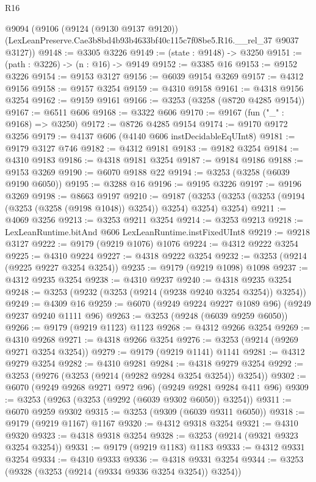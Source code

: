 \begin{lexlean}{R16}
\begin{coremodule}
  @9094
    (@9106
      (@9124 (@9130 @9137 @9120))
      (LexLeanPreserve.Cae3b8bd4b93b4633bf40c115c7f08be5.R16.__rel_37 @9037 @3127))
@9148 := @3305 @3226
@9149 := (state : @9148) -> @3250
@9151 := (path : @3226) -> (n : @16) -> @9149
@9152 := @3385 @16
@9153 := @9152 @3226
@9154 := @9153 @3127
@9156 := @6039 @9154 @3269
@9157 := @4312 @9156
@9158 := @9157 @3254
@9159 := @4310 @9158
@9161 := @4318 @9156 @3254
@9162 := @9159 @9161
@9166 := @3253 (@3258 (@8720 @4285 @9154))
@9167 := @6511 @606
@9168 := @3322 @606
@9170 := @9167 (fun ("_" : @9168) => @3250)
@9172 := @8726 @4285 @9154
@9174 := @9170 @9172 @3256
@9179 := @4137 @606 (@4140 @606 instDecidableEqUInt8)
@9181 := @9179 @3127 @746
@9182 := @4312 @9181
@9183 := @9182 @3254
@9184 := @4310 @9183
@9186 := @4318 @9181 @3254
@9187 := @9184 @9186
@9188 := @9153 @3269
@9190 := @6070 @9188 @22
@9194 := @3253 (@3258 (@6039 @9190 @6050))
@9195 := @3288 @16
@9196 := @9195 @3226
@9197 := @9196 @3269
@9198 := @8663 @9197
@9210 := @9187 (@3253 (@3253 (@3253 (@9194 (@3253 (@3258 (@9198 @1048)) @3254)) @3254) @3254) @3254)
@9211 := @4069 @3256
@9213 := @3253 @9211 @3254
@9214 := @3253 @9213
@9218 := LexLeanRuntime.bitAnd @606 LexLeanRuntime.instFixedUInt8
@9219 := @9218 @3127
@9222 := @9179 (@9219 @1076) @1076
@9224 := @4312 @9222 @3254
@9225 := @4310 @9224
@9227 := @4318 @9222 @3254
@9232 := @3253 (@9214 (@9225 @9227 @3254 @3254))
@9235 := @9179 (@9219 @1098) @1098
@9237 := @4312 @9235 @3254
@9238 := @4310 @9237
@9240 := @4318 @9235 @3254
@9248 := @3253 (@9232 (@3253 (@9214 (@9238 @9240 @3254 @3254)) @3254))
@9249 := @4309 @16
@9259 := @6070 (@9249 @9224 @9227 @1089 @96) (@9249 @9237 @9240 @1111 @96)
@9263 := @3253 (@9248 (@6039 @9259 @6050))
@9266 := @9179 (@9219 @1123) @1123
@9268 := @4312 @9266 @3254
@9269 := @4310 @9268
@9271 := @4318 @9266 @3254
@9276 := @3253 (@9214 (@9269 @9271 @3254 @3254))
@9279 := @9179 (@9219 @1141) @1141
@9281 := @4312 @9279 @3254
@9282 := @4310 @9281
@9284 := @4318 @9279 @3254
@9292 := @3253 (@9276 (@3253 (@9214 (@9282 @9284 @3254 @3254)) @3254))
@9302 := @6070 (@9249 @9268 @9271 @972 @96) (@9249 @9281 @9284 @411 @96)
@9309 := @3253 (@9263 (@3253 (@9292 (@6039 @9302 @6050)) @3254))
@9311 := @6070 @9259 @9302
@9315 := @3253 (@9309 (@6039 @9311 @6050))
@9318 := @9179 (@9219 @1167) @1167
@9320 := @4312 @9318 @3254
@9321 := @4310 @9320
@9323 := @4318 @9318 @3254
@9328 := @3253 (@9214 (@9321 @9323 @3254 @3254))
@9331 := @9179 (@9219 @1183) @1183
@9333 := @4312 @9331 @3254
@9334 := @4310 @9333
@9336 := @4318 @9331 @3254
@9344 := @3253 (@9328 (@3253 (@9214 (@9334 @9336 @3254 @3254)) @3254))

\end{coremodule}
\end{lexlean}
